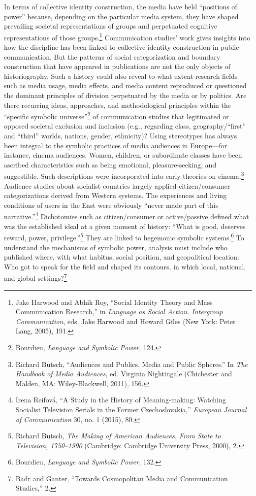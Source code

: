 \documentclass{tufte-handout}
\begin{document}
In terms of collective identity construction, the media have held
``positions of power'' because, depending on the particular media
system, they have shaped prevailing societal representations of groups
and perpetuated cognitive representations of those
groups.\footnote{Jake Harwood and Abhik Roy, ``Social Identity Theory and Mass
  Communication Research,'' in \emph{Language as Social Action.
  Intergroup Communication}, eds. Jake Harwood and Howard Giles (New
  York: Peter Lang, 2005), 191.
} Communication studies'
work gives insights into how the discipline has been linked to
collective identity construction in public communication. But the
patterns of social categorization and boundary construction that have
appeared in publications are not the only objects of historiography.
Such a history could also reveal to what extent research fields such as
media usage, media effects, and media content reproduced or questioned
the dominant principles of division perpetuated by the media or by
politics. Are there recurring ideas, approaches, and methodological
principles within the ``specific symbolic
universe''\footnote{Bourdieu, \emph{Language and Symbolic Power}, 124.
} of communication
studies that legitimated or opposed societal exclusion and inclusion
(e.g., regarding class, geography/``first'' and ``third'' worlds,
nations, gender, ethnicity)? Using stereotypes has always been integral
to the symbolic practices of media audiences in Europe---for instance,
cinema audiences. Women, children, or subordinate classes have been
ascribed characteristics such as being emotional, pleasure-seeking, and
suggestible. Such descriptions were incorporated into early theories on
cinema.\footnote{Richard Butsch, ``Audiences and Publics, Media and Public Spheres.''
  In \emph{The Handbook of Media Audiences}, ed. Virginia Nightingale
  (Chichester and Malden, MA: Wiley-Blackwell, 2011), 156.
} Audience studies about
socialist countries largely applied citizen/consumer categorizations
derived from Western systems. The experiences and living conditions of
users in the East were obviously ``never made part of this
narrative.''\footnote{Irena Reifová, ``A Study in the History of Meaning-making: Watching
  Socialist Television Serials in the Former Czechoslovakia,''
  \emph{European Journal of Communication} 30, no. 1 (2015), 80.
} Dichotomies such as
citizen/consumer or active/passive defined what was the established
ideal at a given moment of history: ``What is good, deserves reward,
power, privilege.''\footnote{Richard Butsch, \emph{The Making of American Audiences. From State to
  Television, 1750--1990} (Cambridge: Cambridge University Press, 2000),
  2.
} They are
linked to hegemonic symbolic
systems.\footnote{Bourdieu, \emph{Language and Symbolic Power}, 132.
} To understand the
mechanisms of symbolic power, analysis must include who published where,
with what habitus, social position, and geopolitical location: Who got
to speak for the field and shaped its contours, in which local,
national, and global settings?\footnote{Badr and Ganter, ``Towards Cosmopolitan Media and Communication
  Studies,'' 2.
}
\end{document}

